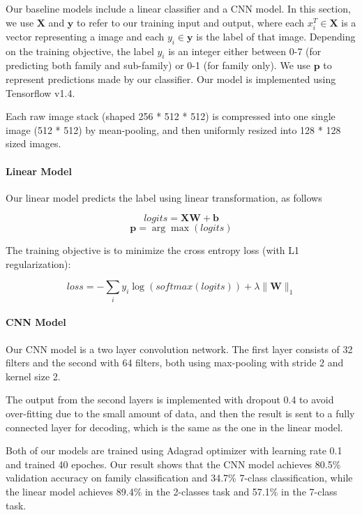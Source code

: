 \documentclass{article}
\begin{document}
Our baseline models include a linear classifier and a CNN model. In this section, we use $\mathbf{X}$ and $\mathbf{y}$ to refer to our training input and output, where each ${x}_i^T\in \mathbf{X}$ is a vector representing a image and each ${y_i}\in \mathbf{y}$ is the label of that image. Depending on the training objective, the label $y_i$ is an integer either between 0-7 (for predicting both family and sub-family) or 0-1 (for family only). We use $\mathbf{p}$ to represent predictions made by our classifier. Our model is implemented using Tensorflow v1.4.

Each raw image stack (shaped 256 * 512 * 512) is compressed into one single image (512 * 512) by mean-pooling, and then uniformly resized into 128 * 128 sized images.

\paragraph{Linear Model}

Our linear model predicts the label using linear transformation, as follows

$$\mathit{logits} = \mathbf{X} \mathbf{W} + \mathbf{b}$$
$$\mathbf{p} = \arg\max(\mathit{logits})$$


The training objective is to minimize the cross entropy loss (with L1 regularization):

$$\mathit{loss} = -\sum\limits_{i} y_i\log(\mathit{softmax}(\mathit{logits})) + \lambda \|\mathbf{W}\|_1$$

\paragraph{CNN Model}

Our CNN model is a two layer convolution network. The first layer consists of 32 filters and the second with 64 filters, both using max-pooling with stride 2 and kernel size 2.

The output from the second layers is implemented with dropout 0.4 to avoid over-fitting due to the small amount of data, and then the result is sent to a fully connected layer for decoding, which is the same as the one in the linear model.

\medskip

Both of our models are trained using Adagrad optimizer with learning rate 0.1 and trained 40 epoches.
Our result shows that the CNN model achieves 80.5\% validation accuracy on family classification and 34.7\% 7-class classification, while the linear model achieves 89.4\% in the 2-classes task and 57.1\% in the 7-class task.
\end{document}
